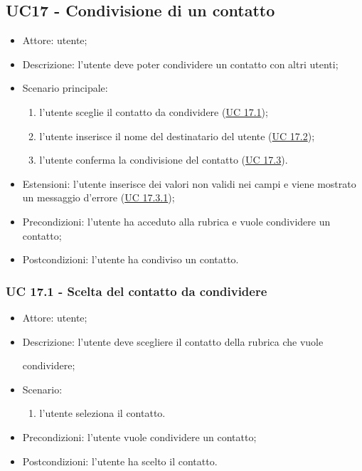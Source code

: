 \subsection{UC17 - Condivisione di un contatto}
\begin{itemize}
    \item Attore: utente;
    \item Descrizione: l'utente deve poter condividere un contatto con altri utenti;
    \item Scenario principale:
        \begin{enumerate}
        \item l'utente sceglie il contatto da condividere (\hyperref[sec: UC 17.1]{UC 17.1});
        \item l'utente inserisce il nome del destinatario del utente (\hyperref[sec: UC 17.2]{UC 17.2});
        \item l'utente conferma la condivisione del contatto (\hyperref[sec: UC 17.3]{UC 17.3}).
        \end{enumerate}
    \item Estensioni: l'utente inserisce dei valori non validi nei campi e viene mostrato un messaggio d'errore (\hyperref[sec: UC 17.3.1]{UC 17.3.1});
    \item Precondizioni: l'utente ha acceduto alla rubrica e vuole condividere un contatto;
    \item Postcondizioni: l'utente ha condiviso un contatto.
\end{itemize}

\subsubsection{UC 17.1 - Scelta del contatto da condividere} \label{sec: UC 17.1}
\begin{itemize}
    \item Attore: utente;
    \item Descrizione: l'utente deve scegliere il contatto della rubrica che vuole \par condividere;
    \item Scenario:
        \begin{enumerate}
        \item l'utente seleziona il contatto.
        \end{enumerate}
    
    \item Precondizioni: l'utente vuole condividere un contatto;
    \item Postcondizioni: l'utente ha scelto il contatto.
\end{itemize}


